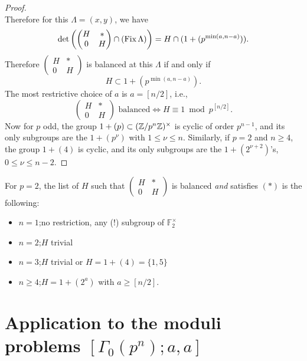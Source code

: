 \begin{proof}
\[\]
Therefore for this $\Lambda = (x,y)$, we have
\[
\det\left(\begin{pmatrix} H & * \\ 0 & H \end{pmatrix} \cap (\operatorname{Fix}\Lambda)\right) = H \cap (1 + (p^{\min(a, n-a)})) .
\]
Therefore $\begin{pmatrix} H & * \\ 0 & H \end{pmatrix}$ is balanced at this $\Lambda$ if and only if
\[
H \subset 1 + (p^{\min(a, n-a)}) .
\]
The most restrictive choice of $a$ is $a = [n/2]$, i.e.,
\[
\begin{pmatrix} H & * \\ 0 & H \end{pmatrix} \text{ balanced} \iff H \equiv 1 \bmod p^{[n/2]} .
\]
Now for $p$ odd, the group $1 + (p) \subset (\mathbb{Z}/p^n\mathbb{Z})^\times$ is cyclic of order $p^{n-1}$, and its only subgroups are the $1 + (p^\nu)$ with $1 \le \nu \le n$. Similarly, if $p = 2$ and $n \ge 4$, the group $1 + (4)$ is cyclic, and its only subgroups are the $1 + (2^{\nu+2})$'s, $0 \le \nu \le n-2$.
\end{proof}

\begin{krem}\label{rem:10.11.3}
For $p = 2$, the list of $H$ such that $\begin{pmatrix} H & * \\ 0 & H \end{pmatrix}$ is balanced \emph{and} satisfies $(*)$ is the following:
\begin{itemize}[label={}]
\item $n = 1$;\quad no restriction, any (!) subgroup of $\mathbb{F}_2^\times$
\item $n = 2$;\quad $H$ trivial
\item $n = 3$;\quad $H$ trivial or $H = 1 + (4) = \{1, 5\}$
\item $n \ge 4$;\quad $H = 1 + (2^a)$ with $a \ge [n/2]$.
\end{itemize}
\end{krem}

\section{Application to the moduli problems $[\Gamma_0(p^n); a, a]$}
\label{sec:10.12}

